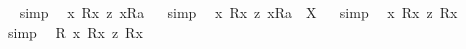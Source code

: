 \begin{isabellebody}
\isadelimproof
\ %
\endisadelimproof
%
\isatagproof
{}\isamarkupfalse%
\ {\isacharparenleft}simp{\isacharparenright}\ \isamarkupfalse%
%
\endisatagproof
{\isafoldproof}%
%
\isadelimproof
%
\endisadelimproof
\isanewline
\isanewline
{}\isamarkupfalse%
\ {\isachardoublequoteopen}{\isacharbrackleft}{\isacharless}{\isasymlambda}x{\isachardot}\ {\isacharless}R{}{\isasymbullet}{\isachardot}x{\isachardot}{\isachargreater}\ {\isasymrightarrow}\isactrlsup z\ {\isacharless}{\isachardot}x{\isachardot}{\isasymcirc}R{}{\isachargreater}{\isacharparenright}{\isasymbullet}a{\isachargreater}{\isacharbrackright}{\isachardoublequoteclose}%
\isadelimproof
\ %
\endisadelimproof
%
\isatagproof
{}\isamarkupfalse%
\ {\isacharparenleft}simp{\isacharparenright}\ \isamarkupfalse%
%
\endisatagproof
{\isafoldproof}%
%
\isadelimproof
%
\endisadelimproof
\isanewline
{}\isamarkupfalse%
\ {\isachardoublequoteopen}{\isacharless}{\isasymlambda}x{\isachardot}\ {\isacharless}R{}{\isasymbullet}{\isachardot}x{\isachardot}{\isachargreater}\ {\isasymrightarrow}\isactrlsup z\ {\isacharless}{\isachardot}x{\isachardot}{\isasymcirc}R{}{\isachargreater}{\isacharparenright}{\isasymbullet}a{\isachargreater}\ {\isacharequal}\ X{\isachardoublequoteclose}%
\isadelimproof
\ %
\endisadelimproof
%
\isatagproof
{}\isamarkupfalse%
\ {\isacharparenleft}simp{\isacharparenright}\ \isamarkupfalse%
%
\endisatagproof
{\isafoldproof}%
%
\isadelimproof
%
\endisadelimproof
\isanewline
\isanewline
{}\isamarkupfalse%
\ {\isachardoublequoteopen}{\isacharbrackleft}{\isasymforall}{\isacharparenleft}{\isasymlambda}x{\isachardot}\ {\isacharless}R{}{\isasymbullet}{\isachardot}x{\isachardot}{\isachargreater}\ {\isasymrightarrow}\isactrlsup z\ {\isacharless}R{}{\isasymbullet}{\isachardot}x{\isachardot}{\isachargreater}{\isacharparenright}{\isacharbrackright}{\isachardoublequoteclose}%
\isadelimproof
\ %
\endisadelimproof
%
\isatagproof
{}\isamarkupfalse%
\ {\isacharparenleft}simp{\isacharparenright}\ \isamarkupfalse%
%
\endisatagproof
{\isafoldproof}%
%
\isadelimproof
%
\endisadelimproof
\isanewline
{}\isamarkupfalse%
\ {\isachardoublequoteopen}{\isacharbrackleft}{\isasymforall}{\isacharparenleft}{\isasymlambda}R{\isachardot}\ {\isasymforall}{\isacharparenleft}{\isasymlambda}x{\isachardot}\ {\isacharless}{\isachardot}R{\isachardot}{\isasymbullet}{\isachardot}x{\isachardot}{\isachargreater}\ {\isasymrightarrow}\isactrlsup z\ {\isacharless}{\isachardot}R{\isachardot}{\isasymbullet}{\isachardot}x{\isachardot}{\isachargreater}{\isacharparenright}{\isacharparenright}{\isacharbrackright}{\isachardoublequoteclose}%

\end{isabellebody}
